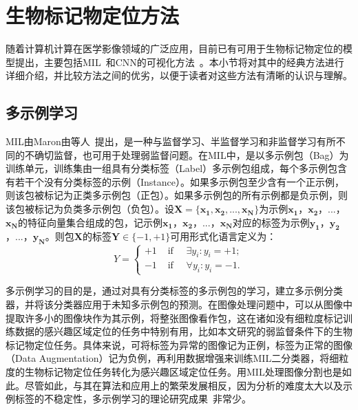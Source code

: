 \section{生物标记物定位方法}
随着计算机计算在医学影像领域的广泛应用，目前已有可用于生物标记物定位的模型提出，主要包括MIL~\cite{maron1998framework}和CNN的可视化方法~\cite{zhou2016learning, selvaraju2017grad}。本小节将对其中的经典方法进行详细介绍，并比较方法之间的优劣，以便于读者对这些方法有清晰的认识与理解。
\subsection{多示例学习}
MIL由Maron由等人~\cite{maron1998framework}提出，是一种与监督学习、半监督学习和非监督学习有所不同的不确切监督，也可用于处理弱监督问题。在MIL中，是以多示例包（Bag）为训练单元，训练集由一组具有分类标签（Label）多示例包组成，每个多示例包含有若干个没有分类标签的示例（Instance）。如果多示例包至少含有一个正示例，则该包被标记为正类多示例包（正包）。如果多示例包的所有示例都是负示例，则该包被标记为负类多示例包（负包）。设$\boldsymbol{X}=\boldsymbol{\{x_1,x_2,...,x_N\}}$为示例$\boldsymbol{x_1}$，$\boldsymbol{x_2}$，...，$\boldsymbol{x_N}$的特征向量集合组成的包，记示例$\boldsymbol{x_1}$，$\boldsymbol{x_2}$，...，$\boldsymbol{x_N}$对应的标签为示例$\boldsymbol{y_1}$，$\boldsymbol{y_2}$，...，$\boldsymbol{y_N}$。则包$\boldsymbol{X}$的标签$\boldsymbol{Y}\in \{-1,+1\}$可用形式化语言定义为：
\begin{equation}
Y=\left\{\begin{array}{ll}
{+1} & {\text { if } \quad \exists y_{i}: y_{i}=+1;} \\
{-1} & {\text { if } \quad \forall y_{i}: y_{i}=-1.}
\end{array}\right.
\end{equation}

\noindent 多示例学习的目的是，通过对具有分类标签的多示例包的学习，建立多示例分类器，并将该分类器应用于未知多示例包的预测。在图像处理问题中，可以从图像中提取许多小的图像块作为其示例，将整张图像看作包，这在诸如没有细粒度标记训练数据的感兴趣区域定位的任务中特别有用，比如本文研究的弱监督条件下的生物标记物定位任务。具体来说，可将标签为异常的图像记为正例，标签为正常的图像（Data Augmentation）记为负例，再利用数据增强来训练MIL二分类器，将细粒度的生物标记物定位任务转化为感兴趣区域定位任务。用MIL处理图像分割也是如此。尽管如此，与其在算法和应用上的繁荣发展相反，因为分析的难度太大以及示例标签的不稳定性，多示例学习的理论研究成果~\cite{gondra2014object, wu2015deep}非常少。

